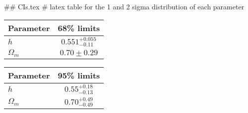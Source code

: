 ## CIs.tex
# latex table for the 1 and 2 sigma distribution of each parameter

\begin{tabular} { l  c}
 Parameter &  68\% limits\\
\hline
{\boldmath$h              $} & $0.551^{+0.055}_{-0.11}    $\\
{\boldmath$\Omega_m       $} & $0.70\pm 0.29              $\\
\hline
\end{tabular}

\begin{tabular} { l  c}
 Parameter &  95\% limits\\
\hline
{\boldmath$h              $} & $0.55^{+0.18}_{-0.13}      $\\
{\boldmath$\Omega_m       $} & $0.70^{+0.49}_{-0.49}      $\\
\hline
\end{tabular}

